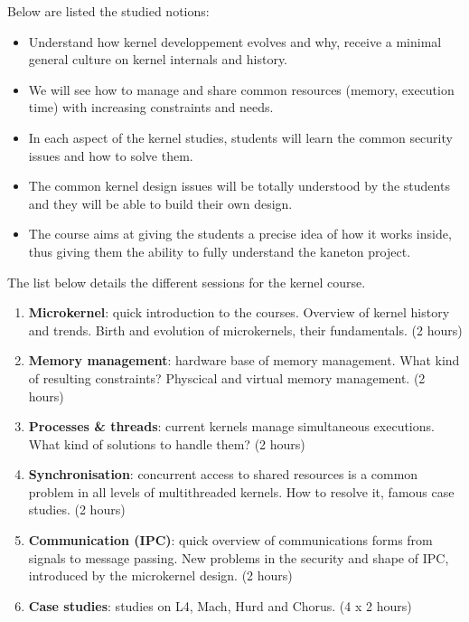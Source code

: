 \begin{multicols}{2}
Below are listed the studied notions:

\begin{itemize}
  \item
    Understand how kernel developpement evolves and why, receive a
    minimal general culture on kernel internals and history.
  \item
    We will see how to manage and share common resources (memory,
    execution time) with increasing constraints and needs.
  \item
    In each aspect of the kernel studies, students will learn the
    common security issues and how to solve them.
  \item
    The common kernel design issues will be totally understood by the
    students and they will be able to build their own design.
  \item
    The course aims at giving the students a precise idea of how it
    works inside, thus giving them the ability to fully understand
    the kaneton project.
\end{itemize}

The list below details the different sessions for the kernel course.

\begin{enumerate}
  \item
    \textbf{Microkernel}: quick introduction to the courses. Overview
    of kernel history and trends. Birth and evolution of microkernels, their
    fundamentals. (2 hours)
  \item
    \textbf{Memory management}: hardware base of memory management. What
    kind of resulting constraints? Physcical and virtual memory
    management. (2 hours)
  \item
    \textbf{Processes \& threads}: current kernels manage simultaneous
    executions. What kind of solutions to handle them? (2 hours)
  \item
    \textbf{Synchronisation}: concurrent access to shared resources is a
    common problem in all levels of multithreaded kernels. How to resolve it,
    famous case studies. (2 hours)
  \item
    \textbf{Communication (IPC)}: quick overview of communications forms
    from signals to message passing. New problems in the security and shape of
    IPC, introduced by the microkernel design. (2 hours)
  \item
    \textbf{Case studies}: studies on L4, Mach, Hurd and Chorus. (4 x 2 hours)
\end{enumerate}


\end{multicols}
